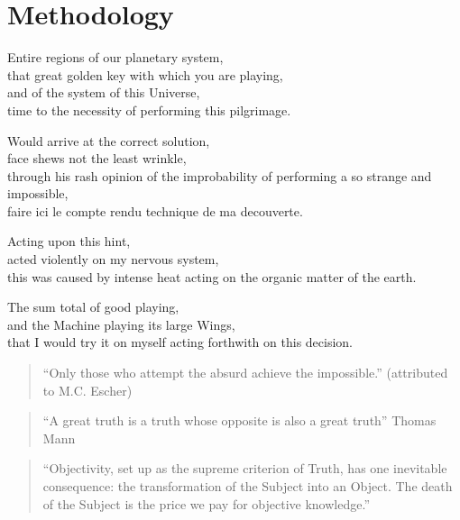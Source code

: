 
\chapter{Methodology}
\label{ch:methodology}

\startcontents[chapters]

Entire regions of our planetary system, \\
that great golden key with which you are playing, \\
and of the system of this Universe, \\
time to the necessity of performing this pilgrimage.

Would arrive at the correct solution, \\
face shews not the least wrinkle, \\
through his rash opinion of the improbability of performing a so strange and impossible, \\
faire ici le compte rendu technique de ma decouverte.

Acting upon this hint, \\
acted violently on my nervous system, \\
this was caused by intense heat acting on the organic matter of the earth.

The sum total of good playing, \\
and the Machine playing its large Wings, \\
that I would try it on myself acting forthwith on this decision.

\vfill
\minicontents
\newpage

\begin{quote}
  ``Only those who attempt the absurd achieve the impossible.'' (attributed to M.C. Escher)
\end{quote}

\begin{quote}
  ``A great truth is a truth whose opposite is also a great truth'' Thomas Mann \autocite[as cited in][]{Wickson2006}
\end{quote}

\begin{quote}
  ``Objectivity, set up as the supreme criterion of Truth, has one inevitable consequence: the transformation of the Subject into an Object. The death of the Subject is the price we pay for objective knowledge.'' \autocite{Nicolescu2010}
\end{quote}

